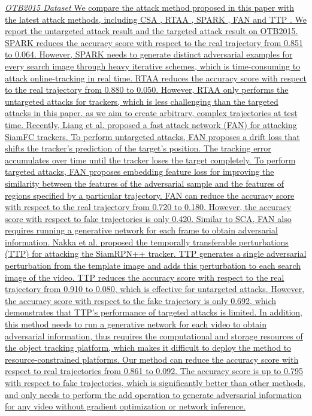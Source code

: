 \documentclass[12pt]{article}
\begin{document}
\uline{
\textit{OTB2015 Dataset} We compare the attack method proposed in this paper with the latest attack methods, including CSA \cite{CSA}, RTAA \cite{RTAA}, SPARK \cite{SPARK}, FAN \cite{FAN} and TTP \cite{TTP}. We report the untargeted attack result and the targeted attack result on OTB2015.
SPARK \cite{SPARK} reduces the accuracy score with respect to the real trajectory from 0.851 to 0.064. However, SPARK needs to generate distinct adversarial examples for every search image through heavy iterative schemes, which is time-consuming to attack online-tracking in real time.
RTAA \cite{RTAA} reduces the accuracy score with respect to the real trajectory from 0.880 to 0.050. However, RTAA only performs the untargeted attacks for trackers, which is less challenging than the targeted attacks in this paper, as we aim to create arbitrary, complex trajectories at test time. 
Recently, Liang et al. proposed a fast attack network (FAN) \cite{FAN} for attacking SiamFC trackers. To perform untargeted attacks, FAN proposes a drift loss that shifts the tracker's prediction of the target's position. The tracking error accumulates over time until the tracker loses the target completely. To perform targeted attacks, FAN proposes embedding feature loss for improving the similarity between the features of the adversarial sample and the features of regions specified by a particular trajectory. FAN can reduce the accuracy score with respect to the real trajectory from 0.720 to 0.180. However, the accuracy score with respect to fake trajectories is only 0.420. Similar to SCA, FAN also requires running a generative network for each frame to obtain adversarial information. Nakka et al. \cite{TTP} proposed the temporally transferable perturbations (TTP) for attacking the SiamRPN++ tracker. TTP generates a single adversarial perturbation from the template image and adds this perturbation to each search image of the video. TTP reduces the accuracy score with respect to the real trajectory from 0.910 to 0.080, which is effective for untargeted attacks. However, the accuracy score with respect to the fake trajectory is only 0.692, which demonstrates that TTP's performance of targeted attacks is limited. In addition, this method needs to run a generative network for each video to obtain adversarial information, thus requires the computational and storage resources of the object tracking platform, which makes it difficult to deploy the method to resource-constrained platforms. Our method can reduce the accuracy score with respect to real trajectories from 0.861 to 0.092. The accuracy score is up to 0.795 with respect to fake trajectories, which is significantly better than other methods, and only needs to perform the add operation to generate adversarial information for any video without gradient optimization or network inference.
}
\end{document}
